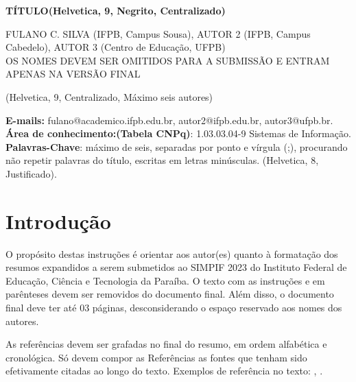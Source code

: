 \documentclass[a4paper,10pt]{article} %
\begin{document}
 

\begin{center}
\textbf{TÍTULO(Helvetica, 9, Negrito, Centralizado)}\vspace{0.5cm}
    
FULANO C. SILVA (IFPB, Campus Sousa), AUTOR 2 (IFPB, Campus Cabedelo), AUTOR 3 (Centro de Educação, UFPB)
\\\color{red}OS NOMES DEVEM SER OMITIDOS PARA A SUBMISSÃO E ENTRAM APENAS NA VERSÃO FINAL\color{black}
    
    (Helvetica, 9, Centralizado, Máximo seis autores)\vspace{0.1cm}
\end{center}
\begingroup
  
  
  
  
\small 
\noindent \textbf{E-mails:} fulano@academico.ifpb.edu.br, autor2@ifpb.edu.br, autor3@ufpb.br.
\\
\noindent\textbf{Área de conhecimento:(Tabela CNPq)}: 1.03.03.04-9 Sistemas de Informação. 
\\
\noindent\textbf{Palavras-Chave}: máximo de seis, separadas por ponto e vírgula (;), procurando não repetir palavras do título, escritas em letras minúsculas. (Helvetica, 8, Justificado).
\endgroup


\section{Introdução}

O propósito destas instruções é orientar aos autor(es) quanto à formatação dos resumos expandidos a serem submetidos ao SIMPIF 2023 do Instituto Federal de Educação, Ciência e Tecnologia da Paraíba. O texto com as instruções e em parênteses devem ser removidos do documento final. Além disso, o documento final deve ter até 03 páginas, desconsiderando o espaço reservado aos nomes dos autores.

As referências devem ser grafadas no final do resumo, em ordem alfabética e cronológica. Só devem compor as Referências as fontes que tenham sido efetivamente citadas ao longo do texto. Exemplos de referência no texto: \cite{galvani}, \cite{national_instruments}.
\end{document}
